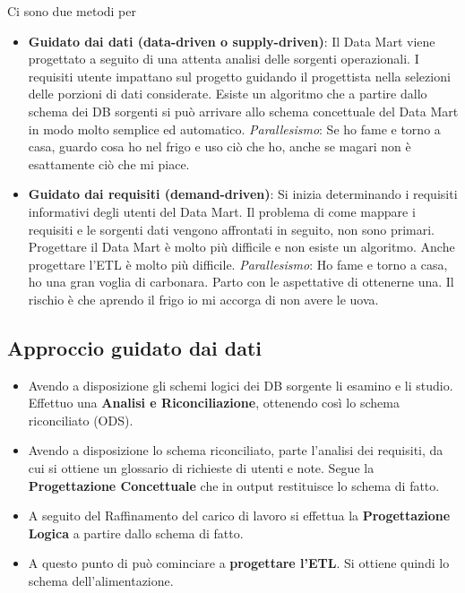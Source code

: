 Ci sono due metodi per
\begin{itemize}
	\item \textbf{Guidato dai dati (data-driven o supply-driven)}: Il Data Mart viene progettato a seguito di una attenta analisi delle sorgenti operazionali. I requisiti utente impattano sul progetto guidando il progettista nella selezioni delle porzioni di dati considerate.\newline
	Esiste un algoritmo che a partire dallo schema dei DB sorgenti si può arrivare allo schema concettuale del Data Mart in modo molto semplice ed automatico.
	\textit{Parallesismo}: Se ho fame e torno a casa, guardo cosa ho nel frigo e uso ciò che ho, anche se magari non è esattamente ciò che mi piace.
	\item \textbf{Guidato dai requisiti (demand-driven)}: Si inizia determinando i requisiti informativi degli utenti del Data Mart. Il problema di come mappare i requisiti e le sorgenti dati vengono affrontati in seguito, non sono primari.\newline
	Progettare il Data Mart è molto più difficile e non esiste un algoritmo. Anche progettare l'ETL è molto più difficile.\newline
	\textit{Parallesismo}: Ho fame e torno a casa, ho una gran voglia di carbonara. Parto con le aspettative di ottenerne una. Il rischio è che aprendo il frigo io mi accorga di non avere le uova.
\end{itemize}

\subsection{Approccio guidato dai dati}
\begin{itemize}
	\item Avendo a disposizione gli schemi logici dei DB sorgente li esamino e li studio. Effettuo una \textbf{Analisi e Riconciliazione}, ottenendo così lo schema riconciliato (ODS).
	\item Avendo a disposizione lo schema riconciliato, parte l'analisi dei requisiti, da cui si ottiene un glossario di richieste di utenti e note. Segue la \textbf{Progettazione Concettuale} che in output restituisce lo schema di fatto.
	\item A seguito del Raffinamento del carico di lavoro si effettua la \textbf{Progettazione Logica} a partire dallo schema di fatto.
	\item A questo punto di può cominciare a \textbf{progettare l'ETL}. Si ottiene quindi lo schema dell'alimentazione.
\end{itemize}

